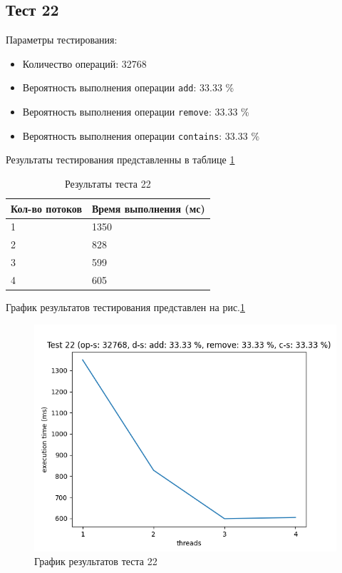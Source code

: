 \subsection*{Тест 22}

Параметры тестирования:

\begin{itemize}
    \item Количество операций: 32768
    \item Вероятность выполнения операции \verb|add|: 33.33 \%
    \item Вероятность выполнения операции \verb|remove|: 33.33 \%
    \item Вероятность выполнения операции \verb|contains|: 33.33 \%
\end{itemize}

Результаты тестирования представленны в таблице \ref{tab:results22}


\begin{table}[H]
    \centering
    \begin{tabular}{|l|l|}
        \hline
        Кол-во потоков & Время выполнения (мс) \\
        \hline
        1 & 1350 \\
        \hline
        2 & 828 \\
        \hline
        3 & 599 \\
        \hline
        4 & 605 \\
        \hline
    \end{tabular}
    \caption{Результаты теста 22}
    \label{tab:results22}
\end{table}
        

График результатов тестирования представлен на рис.\ref{fig:plot22}

\begin{figure}[H]
    \centering
    \includegraphics[width=0.7\linewidth]{photo/plot22}
    \caption{График результатов теста 22}
    \label{fig:plot22}
\end{figure}

